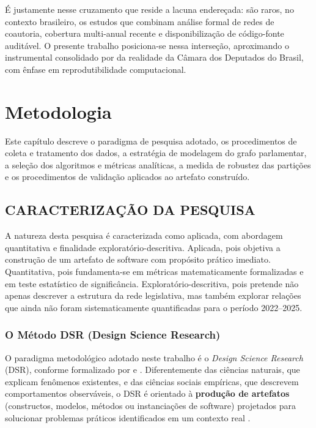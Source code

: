 \documentclass[
      12pt,
      a4paper,
      openright,
      oneside,
      chapter=TITLE,
      section=TITLE,
      english,
      french,
      spanish,
      brazilian
    ]{abntex2}
\begin{document}
    É justamente nesse cruzamento que reside a lacuna endereçada: são raros, no contexto brasileiro, os estudos que combinam análise formal de redes de coautoria, cobertura multi-anual recente e disponibilização de código-fonte auditável. O presente trabalho posiciona-se nessa interseção, aproximando o instrumental consolidado por \cite{fowler2006} da realidade da Câmara dos Deputados do Brasil, com ênfase em reprodutibilidade computacional.
    
    \chapter{Metodologia}
    \label{cap:metodologia}
    
    Este capítulo descreve o paradigma de pesquisa adotado, os procedimentos de coleta e
    tratamento dos dados, a estratégia de modelagem do grafo parlamentar, a seleção dos algoritmos
    e métricas analíticas, a medida de robustez das partições e os procedimentos de
    validação aplicados ao artefato construído.
    
    \section{CARACTERIZAÇÃO DA PESQUISA}
    
    A natureza desta pesquisa é caracterizada como aplicada, com abordagem quantitativa e finalidade exploratório-descritiva. Aplicada, pois objetiva a construção de um artefato de software com propósito prático imediato. Quantitativa, pois fundamenta-se em métricas matematicamente formalizadas e em teste estatístico de significância. Exploratório-descritiva, pois pretende não apenas descrever a estrutura da rede legislativa, mas também explorar relações que ainda não foram sistematicamente quantificadas para o período 2022--2025.
    
    \subsection{O Método DSR (Design Science Research)}
    
    O paradigma metodológico adotado neste trabalho é o \textit{Design Science Research} (DSR), conforme formalizado por  e . Diferentemente das ciências naturais, que explicam fenômenos existentes, e das ciências sociais empíricas, que descrevem comportamentos observáveis, o DSR é orientado à \textbf{produção de artefatos} (constructos, modelos, métodos ou instanciações de software) projetados para solucionar problemas práticos identificados em um contexto real \cite{hevner2004, wieringa2014}.
    
\end{document}
